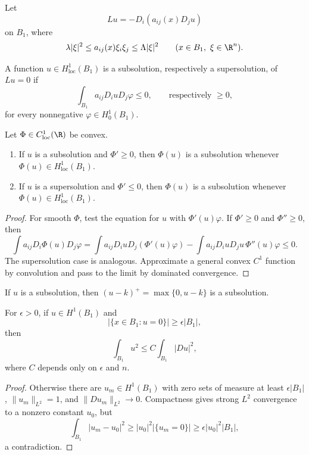 Let
\[
Lu=-D_i(a_{ij}(x)D_j u)
\]
on $B_1$, where
\[
\lambda|\xi|^2\leq a_{ij}(x)\xi_i\xi_j\leq\Lambda|\xi|^2
\qquad(x\in B_1,\ \xi\in\R^n).
\]

\begin{definition}\label{hanlin:weaksol-part2-homogeneous-subsolution}
A function $u\in H^1_{\mathrm{loc}}(B_1)$ is a subsolution, respectively a
supersolution, of $Lu=0$ if
\[
\int_{B_1}a_{ij}D_i uD_j\varphi\leq0,
\qquad\text{respectively }\geq0,
\]
for every nonnegative $\varphi\in H^1_0(B_1)$.
\end{definition}

\begin{lemma}\label{hanlin:weaksol-part2-convex-composition}
Let $\Phi\in C^1_{\mathrm{loc}}(\R)$ be convex.
\begin{enumerate}
\item[(i)] If $u$ is a subsolution and $\Phi'\geq0$, then
$\Phi(u)$ is a subsolution whenever $\Phi(u)\in H^1_{\mathrm{loc}}(B_1)$.
\item[(ii)] If $u$ is a supersolution and $\Phi'\leq0$, then
$\Phi(u)$ is a subsolution whenever $\Phi(u)\in H^1_{\mathrm{loc}}(B_1)$.
\end{enumerate}
\end{lemma}
\begin{proof}
\sketch For smooth $\Phi$, test the equation for $u$ with
$\Phi'(u)\varphi$. If $\Phi'\geq0$ and $\Phi''\geq0$, then
\[
\int a_{ij}D_i\Phi(u)D_j\varphi
=\int a_{ij}D_i uD_j(\Phi'(u)\varphi)
-\int a_{ij}D_i uD_j u\,\Phi''(u)\varphi\leq0.
\]
The supersolution case is analogous. Approximate a general convex $C^1$
function by convolution and pass to the limit by dominated convergence.
\end{proof}

\begin{remark}\label{hanlin:weaksol-part2-positive-part-subsolution}
If $u$ is a subsolution, then $(u-k)^+=\max\{0,u-k\}$ is a subsolution.
\end{remark}

\begin{lemma}\label{hanlin:weaksol-part2-poincare-sobolev-zero-set}
For $\epsilon>0$, if $u\in H^1(B_1)$ and
\[
|\{x\in B_1:u=0\}|\geq\epsilon|B_1|,
\]
then
\[
\int_{B_1}u^2\leq C\int_{B_1}|Du|^2,
\]
where $C$ depends only on $\epsilon$ and $n$.
\end{lemma}
\begin{proof}
\sketch Otherwise there are $u_m\in H^1(B_1)$ with zero sets of measure
at least $\epsilon|B_1|$, $\|u_m\|_{L^2}=1$, and
$\|Du_m\|_{L^2}\to0$. Compactness gives strong $L^2$ convergence to a
nonzero constant $u_0$, but
\[
\int_{B_1}|u_m-u_0|^2
\geq|u_0|^2|\{u_m=0\}|\geq\epsilon|u_0|^2|B_1|,
\]
a contradiction.
\end{proof}

